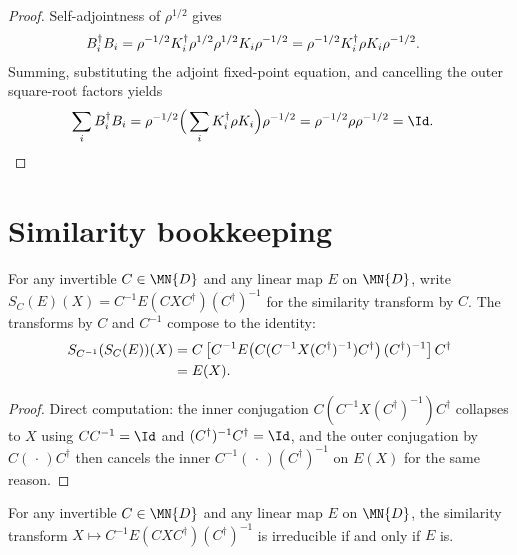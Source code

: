 \begin{proof}\leanok
    Self-adjointness of $\rho^{1/2}$ gives
    \begin{align}
        B_i^\dagger B_i
         & =\rho^{-1/2}K_i^\dagger\rho^{1/2}\rho^{1/2}K_i\rho^{-1/2}
          =\rho^{-1/2}K_i^\dagger\rho K_i\rho^{-1/2}.
        \notag
    \end{align}
    Summing, substituting the adjoint fixed-point equation, and cancelling the
    outer square-root factors yields
    \begin{align}
        \sum_iB_i^\dagger B_i
         & =\rho^{-1/2}\Big(\sum_iK_i^\dagger\rho K_i\Big)\rho^{-1/2}
          =\rho^{-1/2}\rho\rho^{-1/2}
          =\Id.
        \notag
    \end{align}
\end{proof}

\section{Similarity bookkeeping}
\label{sec:app_qpf_similarity}

\begin{lemma}%
    \label{lem:similarity_involution}
    \leanok
    For any invertible $C \in \MN{D}$ and any linear map $E$ on $\MN{D}$,
    write $S_C(E)(X)=C^{-1}E(CXC^\dagger)(C^\dagger)^{-1}$ for the
    similarity transform by $C$. The transforms by $C$ and $C^{-1}$ compose
    to the identity:
    \begin{align}
        S_{C^{-1}}(S_C(E))(X)
         & =C\left[C^{-1}E\!\left(C(C^{-1}X(C^\dagger)^{-1})C^\dagger\right)
                 (C^\dagger)^{-1}\right]C^\dagger \notag \\
         & =E(X).
        \label{eq:qpf_similarity_involution}
    \end{align}
\end{lemma}

\begin{proof}\leanok
    Direct computation: the inner conjugation
    $C(C^{-1}X(C^\dagger)^{-1})C^\dagger$ collapses to $X$
    using $CC^{-1} = \Id$ and $(C^\dagger)^{-1}C^\dagger = \Id$, and the
    outer conjugation by $C(\,\cdot\,)C^\dagger$ then cancels the inner
    $C^{-1}(\,\cdot\,)(C^\dagger)^{-1}$ on $E(X)$ for the same reason.
\end{proof}

\begin{lemma}%
    \label{lem:similarity_irred_iff}
    \leanok
    For any invertible $C \in \MN{D}$ and any linear map $E$ on $\MN{D}$,
    the similarity transform
    $X \mapsto C^{-1}E(CXC^\dagger)(C^\dagger)^{-1}$
    is irreducible if and only if $E$ is.
\end{lemma}

